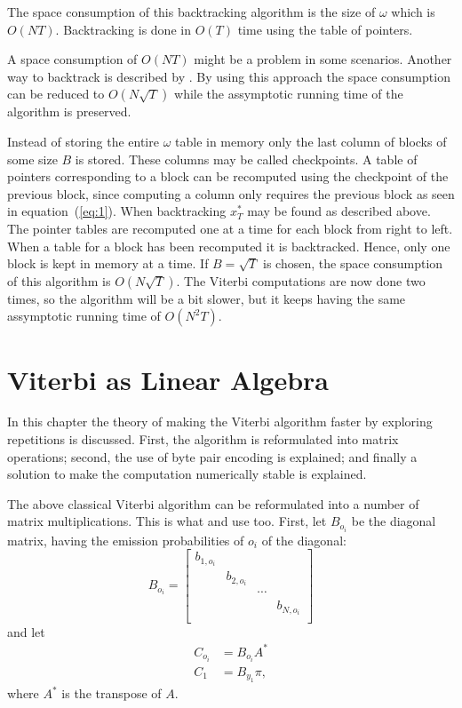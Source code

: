 The space consumption of this backtracking algorithm is the size of $\omega$
which is $O(N T)$. Backtracking is done in $O(T)$ time using the table of pointers.

A space consumption of $O(N T)$ might be a problem in some scenarios. Another
way to backtrack is described by \citet{Tarnas01061998}. By using this approach
the space consumption can be reduced to $O(N \sqrt{T})$ while the assymptotic
running time of the algorithm is preserved.

Instead of storing the entire $\omega$ table in memory only the last column of
blocks of some size $B$ is stored. These columns may be called checkpoints. A
table of pointers corresponding to a block can be recomputed using the
checkpoint of the previous block, since computing a column only requires the
previous block as seen in equation~(\ref{eq:1}). When backtracking $x_T^*$ may
be found as described above. The pointer tables are recomputed one at a time
for each block from right to left. When a table for a block has been recomputed
it is backtracked. Hence, only one block is kept in memory at a time. If
$B = \sqrt{T}$ is chosen, the space consumption of this algorithm is
$O(N \sqrt{T})$. The Viterbi computations are now done two times, so the
algorithm will be a bit slower, but it keeps having the same assymptotic
running time of $O(N^2 T)$.

\section{Viterbi as Linear Algebra}
\label{sec:algorithm-as-linear}

In this chapter the theory of making the Viterbi algorithm faster by exploring
repetitions is discussed. First, the algorithm is reformulated into matrix
operations; second, the use of byte pair encoding is explained; and finally
a solution to make the computation numerically stable is explained.

The above classical Viterbi algorithm can be reformulated into a number of
matrix multiplications. This is what \citet{sand2013ziphmmlib} and
\citet{lifshits2009speeding} use too. First, let $B_{o_i}$ be the diagonal
matrix, having the emission probabilities of $o_i$ of the diagonal:
\begin{equation*}
  B_{o_i} =
  \begin{bmatrix}
    b_{1, o_i} &            &        &            \\
               & b_{2, o_i} &        &            \\
               &            & \cdots &            \\
               &            &        & b_{N, o_i} \\
  \end{bmatrix}
\end{equation*}
and let
\begin{align*}
  C_{o_i} &= B_{o_i} A^* \\
  C_1 &= B_{y_1} \pi,
\end{align*}
where $A^*$ is the transpose of $A$.

